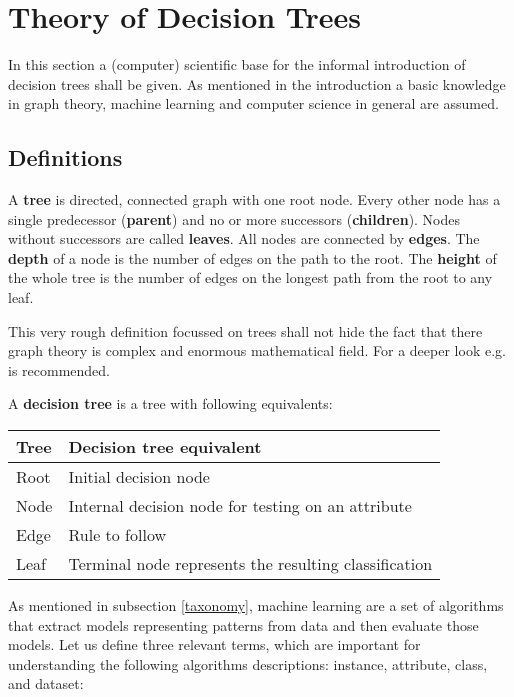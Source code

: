
\section{Theory of Decision Trees}

In this section a (computer) scientific base for the informal introduction of decision trees shall be given. As mentioned in the introduction a basic knowledge in graph theory, machine learning and computer science in general are assumed.


\subsection{Definitions}

\begin{definition}
A \textbf{tree} is directed, connected graph with one root node. Every other node has a single predecessor (\textbf{parent}) and no or more successors (\textbf{children}). Nodes without successors are called \textbf{leaves}. All nodes are connected by \textbf{edges}. The \textbf{depth} of a node is the number of edges on the path to the root. The \textbf{height} of the whole tree is the number of edges on the longest path from the root to any leaf. 
\end{definition}

\begin{remark}
This very rough definition focussed on trees shall not hide the fact that there graph theory is complex and enormous mathematical field. For a deeper look e.g. \cite{cormen2001introduction} is recommended.
\end{remark}

\begin{definition}
A \textbf{decision tree} is a tree with following equivalents:
\begin{center}
\begin{tabular}{l|l} 
    \textbf{Tree} &  \textbf{Decision tree equivalent} \\ \hline
    Root & Initial decision node  \\ 
    Node & Internal decision node for testing on an attribute  \\ 
    Edge & Rule to follow \\ 
    Leaf & Terminal node represents the resulting classification 
\end{tabular}
\end{center}
\end{definition}

As mentioned in subsection \ref{taxonomy}, machine learning are a set of algorithms that extract models representing patterns from data and then evaluate those models. Let us define three relevant terms, which are important for understanding the following algorithms descriptions: instance, attribute, class, and dataset:

